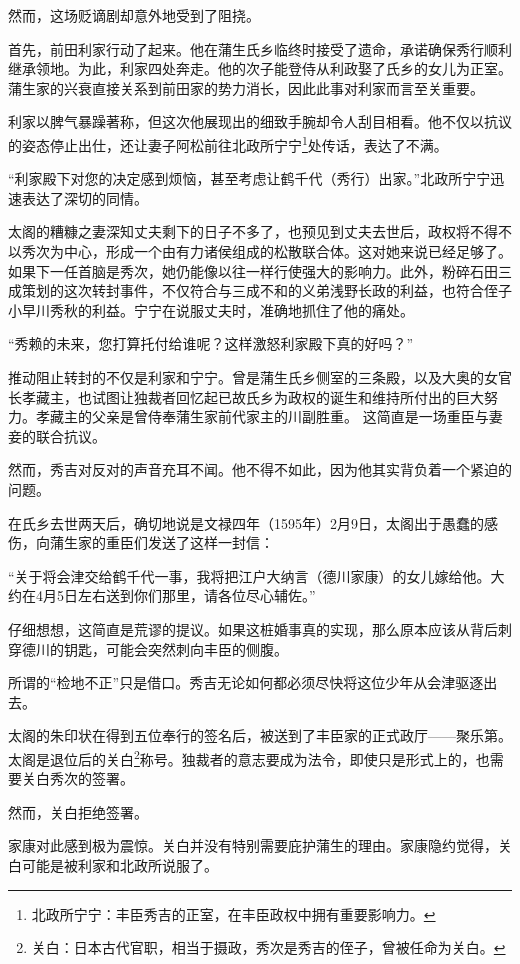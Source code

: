 \documentclass[
]{article}
\begin{document}
然而，这场贬谪剧却意外地受到了阻挠。

首先，前田利家行动了起来。他在蒲生氏乡临终时接受了遗命，承诺确保秀行顺利继承领地。为此，利家四处奔走。他的次子能登侍从利政娶了氏乡的女儿为正室。蒲生家的兴衰直接关系到前田家的势力消长，因此此事对利家而言至关重要。

利家以脾气暴躁著称，但这次他展现出的细致手腕却令人刮目相看。他不仅以抗议的姿态停止出仕，还让妻子阿松前往北政所宁宁\footnote{北政所宁宁：丰臣秀吉的正室，在丰臣政权中拥有重要影响力。}处传话，表达了不满。

``利家殿下对您的决定感到烦恼，甚至考虑让鹤千代（秀行）出家。''北政所宁宁迅速表达了深切的同情。

太阁的糟糠之妻深知丈夫剩下的日子不多了，也预见到丈夫去世后，政权将不得不以秀次为中心，形成一个由有力诸侯组成的松散联合体。这对她来说已经足够了。如果下一任首脑是秀次，她仍能像以往一样行使强大的影响力。此外，粉碎石田三成策划的这次转封事件，不仅符合与三成不和的义弟浅野长政的利益，也符合侄子小早川秀秋的利益。宁宁在说服丈夫时，准确地抓住了他的痛处。

``秀赖的未来，您打算托付给谁呢？这样激怒利家殿下真的好吗？''

推动阻止转封的不仅是利家和宁宁。曾是蒲生氏乡侧室的三条殿，以及大奥的女官长孝藏主，也试图让独裁者回忆起已故氏乡为政权的诞生和维持所付出的巨大努力。孝藏主的父亲是曾侍奉蒲生家前代家主的川副胜重。
这简直是一场重臣与妻妾的联合抗议。

然而，秀吉对反对的声音充耳不闻。他不得不如此，因为他其实背负着一个紧迫的问题。

在氏乡去世两天后，确切地说是文禄四年（1595年）2月9日，太阁出于愚蠢的感伤，向蒲生家的重臣们发送了这样一封信：

``关于将会津交给鹤千代一事，我将把江户大纳言（德川家康）的女儿嫁给他。大约在4月5日左右送到你们那里，请各位尽心辅佐。''

仔细想想，这简直是荒谬的提议。如果这桩婚事真的实现，那么原本应该从背后刺穿德川的钥匙，可能会突然刺向丰臣的侧腹。

所谓的``检地不正''只是借口。秀吉无论如何都必须尽快将这位少年从会津驱逐出去。

太阁的朱印状在得到五位奉行的签名后，被送到了丰臣家的正式政厅------聚乐第。太阁是退位后的关白\footnote{关白：日本古代官职，相当于摄政，秀次是秀吉的侄子，曾被任命为关白。}称号。独裁者的意志要成为法令，即使只是形式上的，也需要关白秀次的签署。

然而，关白拒绝签署。

家康对此感到极为震惊。关白并没有特别需要庇护蒲生的理由。家康隐约觉得，关白可能是被利家和北政所说服了。
\end{document}
